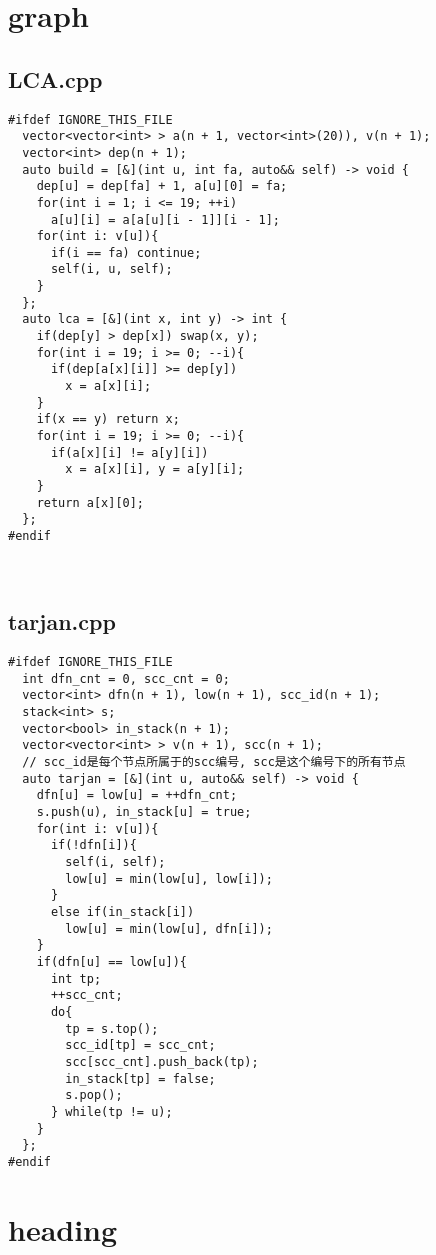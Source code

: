 \documentclass[UTF8, a4paper, titlepage, twoside]{ctexart}
\begin{document}
\clearpage
\section{graph}
\subsection{LCA.cpp}
\begin{verbatim}
#ifdef IGNORE_THIS_FILE
  vector<vector<int> > a(n + 1, vector<int>(20)), v(n + 1);
  vector<int> dep(n + 1);
  auto build = [&](int u, int fa, auto&& self) -> void {
    dep[u] = dep[fa] + 1, a[u][0] = fa;
    for(int i = 1; i <= 19; ++i)
      a[u][i] = a[a[u][i - 1]][i - 1];
    for(int i: v[u]){
      if(i == fa) continue;
      self(i, u, self);
    }
  };
  auto lca = [&](int x, int y) -> int {
    if(dep[y] > dep[x]) swap(x, y);
    for(int i = 19; i >= 0; --i){
      if(dep[a[x][i]] >= dep[y]) 
        x = a[x][i];
    }
    if(x == y) return x;
    for(int i = 19; i >= 0; --i){
      if(a[x][i] != a[y][i])
        x = a[x][i], y = a[y][i];
    }
    return a[x][0];
  };
#endif



\end{verbatim}

\subsection{tarjan.cpp}
\begin{verbatim}
#ifdef IGNORE_THIS_FILE
  int dfn_cnt = 0, scc_cnt = 0;
  vector<int> dfn(n + 1), low(n + 1), scc_id(n + 1); 
  stack<int> s;
  vector<bool> in_stack(n + 1);
  vector<vector<int> > v(n + 1), scc(n + 1);
  // scc_id是每个节点所属于的scc编号, scc是这个编号下的所有节点
  auto tarjan = [&](int u, auto&& self) -> void {
    dfn[u] = low[u] = ++dfn_cnt;
    s.push(u), in_stack[u] = true;
    for(int i: v[u]){
      if(!dfn[i]){
        self(i, self);
        low[u] = min(low[u], low[i]);
      }
      else if(in_stack[i])
        low[u] = min(low[u], dfn[i]);
    }
    if(dfn[u] == low[u]){
      int tp;
      ++scc_cnt;
      do{
        tp = s.top();
        scc_id[tp] = scc_cnt;
        scc[scc_cnt].push_back(tp);
        in_stack[tp] = false;
        s.pop();
      } while(tp != u);
    }
  };
#endif
\end{verbatim}

\clearpage
\section{heading}
\end{document}
